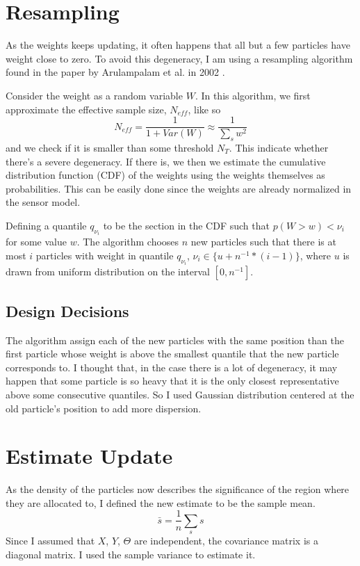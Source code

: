 \documentclass[10pt]{article}
\begin{document}
\section{Resampling}
As the weights keeps updating, it often happens that all but a few particles have weight close to zero. To avoid this degeneracy, I am using a resampling algorithm found in the paper by Arulampalam et al. in 2002 \cite[p. 180]{paper}. 

Consider the weight as a random variable $W$. In this algorithm, we first approximate the effective sample size, $N_{eff}$, like so
\begin{displaymath}
	N_{eff} = \frac{1}{1+Var(W)} \approx \frac{1}{\sum_{s}w^2}
\end{displaymath}
and we check if it is smaller than some threshold $N_T$. This indicate whether there's a severe degeneracy. If there is, we then we estimate the cumulative distribution function (CDF) of the weights using the weights themselves as probabilities. This can be easily done since the weights are already normalized in the sensor model. 

Defining a quantile $q_{\nu_i}$ to be the section in the CDF such that $p(W > w) < \nu_i$ for some value $w$. The algorithm chooses $n$ new particles such that there is at most $i$ particles with weight in quantile $q_{\nu_i}$, $\nu_i\in \{u +n^{-1}*(i-1)\}$, where $u$ is drawn from uniform distribution on the interval $[0, n^{-1}]$.

\subsection{Design Decisions}
The algorithm assign each of the new particles with the same position than the first particle whose weight is above the smallest quantile that the new particle corresponds to. I thought that, in the case there is a lot of degeneracy, it may happen that some particle is so heavy that it is the only closest representative above some consecutive quantiles. So I used Gaussian distribution centered at the old particle's position to add more dispersion.
 
\section{Estimate Update}
As the density of the particles now describes the significance of the region where they are allocated to, I defined the new estimate to be the sample mean.
\begin{displaymath}
	\bar{s} = \frac{1}{n}\sum_{s} s
\end{displaymath}
Since I assumed that $X$, $Y$, $\Theta$ are independent, the covariance matrix is a diagonal matrix. I used the sample variance to estimate it. 
\end{document}
